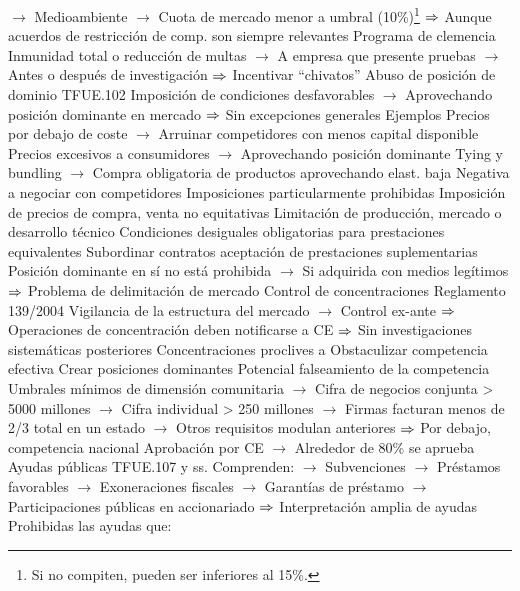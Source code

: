 \documentclass{nuevotema}
\begin{document}
\begin{esquemal}
				\4[] $\to$ Medioambiente
				\4[] $\to$ Cuota de mercado menor a umbral (10\%)\footnote{Si no compiten, pueden ser inferiores al 15\%.}
				\4[] $\Rightarrow$ Aunque acuerdos de restricción de comp. son siempre relevantes
				\4 Programa de clemencia
				\4[] Inmunidad total o reducción de multas
				\4[] $\to$ A empresa que presente pruebas
				\4[] $\to$ Antes o después de investigación
				\4[] $\Rightarrow$ Incentivar ``chivatos''
			\3 Abuso de posición de dominio
				\4 TFUE.102
				\4 Imposición de condiciones desfavorables
				\4[] $\to$ Aprovechando posición dominante en mercado
				\4[] $\Rightarrow$ Sin excepciones generales
				\4 Ejemplos
				\4[] Precios por debajo de coste
				\4[] $\to$ Arruinar competidores con menos capital disponible
				\4[] Precios excesivos a consumidores
				\4[] $\to$ Aprovechando posición dominante
				\4[] Tying y bundling
				\4[] $\to$ Compra obligatoria de productos aprovechando elast. baja
				\4[] Negativa a negociar con competidores
				\4 Imposiciones particularmente prohibidas
				\4[] Imposición de precios de compra, venta no equitativas
				\4[] Limitación de producción, mercado o desarrollo técnico
				\4[] Condiciones desiguales obligatorias para prestaciones equivalentes
				\4[] Subordinar contratos aceptación de prestaciones suplementarias
				\4 Posición dominante en sí no está prohibida
				\4[] $\to$ Si adquirida con medios legítimos
				\4[] $\Rightarrow$ Problema de delimitación de mercado
			\3 Control de concentraciones
				\4 Reglamento 139/2004
				\4 Vigilancia de la estructura del mercado
				\4[] $\to$ Control ex-ante
				\4[] $\Rightarrow$ Operaciones de concentración deben notificarse a CE
				\4[] $\Rightarrow$ Sin investigaciones sistemáticas posteriores
				\4 Concentraciones proclives a
				\4[] Obstaculizar competencia efectiva
				\4[] Crear posiciones dominantes
				\4[] Potencial falseamiento de la competencia
				\4 Umbrales mínimos de dimensión comunitaria
				\4[] $\to$ Cifra de negocios conjunta > 5000 millones
				\4[] $\to$ Cifra individual > 250 millones
				\4[] $\to$ Firmas facturan menos de 2/3 total en un estado
				\4[] $\to$ Otros requisitos modulan anteriores
				\4[] $\Rightarrow$ Por debajo, competencia nacional
				\4 Aprobación por CE
				\4[] $\to$ Alrededor de 80\% se aprueba
			\3 Ayudas públicas
				\4 TFUE.107 y ss.
				\4 Comprenden:
				\4[] $\to$ Subvenciones
				\4[] $\to$ Préstamos favorables
				\4[] $\to$ Exoneraciones fiscales
				\4[] $\to$ Garantías de préstamo
				\4[] $\to$ Participaciones públicas en accionariado
				\4[] $\Rightarrow$ Interpretación amplia de ayudas
				\4 Prohibidas las ayudas que:

\end{esquemal}
\end{document}
